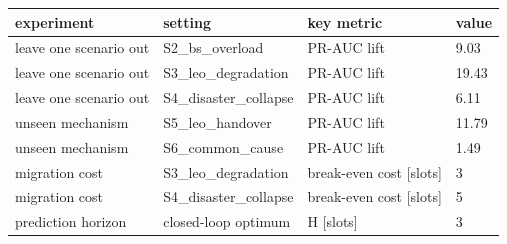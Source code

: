 \begin{tabular}{llll}
\toprule
experiment & setting & key metric & value \\
\midrule
leave one scenario out & S2\_bs\_overload & PR-AUC lift & 9.03 \\
leave one scenario out & S3\_leo\_degradation & PR-AUC lift & 19.43 \\
leave one scenario out & S4\_disaster\_collapse & PR-AUC lift & 6.11 \\
unseen mechanism & S5\_leo\_handover & PR-AUC lift & 11.79 \\
unseen mechanism & S6\_common\_cause & PR-AUC lift & 1.49 \\
migration cost & S3\_leo\_degradation & break-even cost [slots] & 3 \\
migration cost & S4\_disaster\_collapse & break-even cost [slots] & 5 \\
prediction horizon & closed-loop optimum & H [slots] & 3 \\
\bottomrule
\end{tabular}

